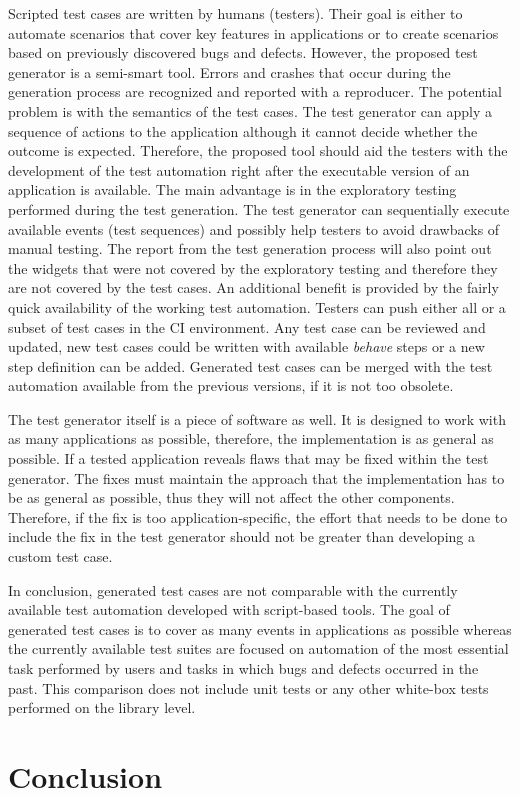 Scripted test cases are written by humans (testers). Their goal is either to automate scenarios that cover key features in applications or to create scenarios based on previously discovered bugs and defects. However, the proposed test generator is a semi-smart tool. Errors and crashes that occur during the generation process are recognized and reported with a reproducer. The potential problem is with the semantics of the test cases. The test generator can apply a sequence of actions to the application although it cannot decide whether the outcome is expected. Therefore, the proposed tool should aid the testers with the development of the test automation right after the executable version of an application is available. The main advantage is in the exploratory testing performed during the test generation. The test generator can sequentially execute available events (test sequences) and possibly help testers to avoid drawbacks of manual testing. The report from the test generation process will also point out the widgets that were not covered by the exploratory testing and therefore they are not covered by the test cases. An additional benefit is provided by the fairly quick availability of the working test automation. Testers can push either all or a subset of test cases in the CI environment. Any test case can be reviewed and updated, new test cases could be written with available \textit{behave} steps or a new step definition can be added. Generated test cases can be merged with the test automation available from the previous versions, if it is not too obsolete.

The test generator itself is a piece of software as well. It is designed to work with as many applications as possible, therefore, the implementation is as general as possible. If a tested application reveals flaws that may be fixed within the test generator. The fixes must maintain the approach that the implementation has to be as general as possible, thus they will not affect the other components. Therefore, if the fix is too application-specific, the effort that needs to be done to include the fix in the test generator should not be greater than developing a custom test case.

In conclusion, generated test cases are not comparable with the currently available test automation developed with script-based tools. The goal of generated test cases is to cover as many events in applications as possible whereas the currently available test suites are focused on automation of the most essential task performed by users and tasks in which bugs and defects occurred in the past. This comparison does not include unit tests or any other white-box tests performed on the library level.


\chapter{Conclusion}
